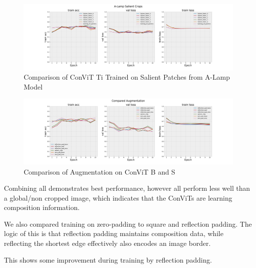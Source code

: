 \begin{figure}
    \centering
    \includegraphics[width=\textwidth]{figures/results_and_discussion/A-Lamp Salient Crops.png}
    \caption{Comparison of ConViT Ti Trained on Salient Patches from A-Lamp Model \cite{Ma2017}}
    \label{fig:sub_patching}
\end{figure}
\begin{figure}
    \centering
    \includegraphics[width=\textwidth]{figures/results_and_discussion/Compared Augmentation.png}
    \caption{Comparison of Augmentation on ConViT B and S}
    \label{fig:my_label}
\end{figure}

Combining all demonstrates best performance, however all perform less well than a global/non cropped image, which indicates that the ConViTs are learning composition information.

We also compared training on zero-padding to square and reflection padding. The logic of this is that reflection padding maintains composition data, while reflecting the shortest edge effectively also encodes an image border.

This shows some improvement during training by reflection padding. 

